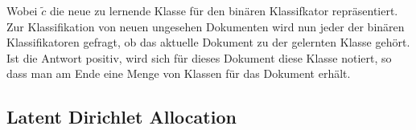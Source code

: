 Wobei $\tilde c$ die neue zu lernende Klasse für den binären Klassifkator repräsentiert.
Zur Klassifikation von neuen ungesehen Dokumenten wird nun jeder der binären Klassifikatoren gefragt, ob das aktuelle Dokument zu der gelernten Klasse gehört.
Ist die Antwort positiv, wird sich für dieses Dokument diese Klasse notiert, so dass man am Ende eine Menge von Klassen für das Dokument erhält.




\subsection{Latent Dirichlet Allocation}
\label{sub:latent_dirichlet_allocation}

